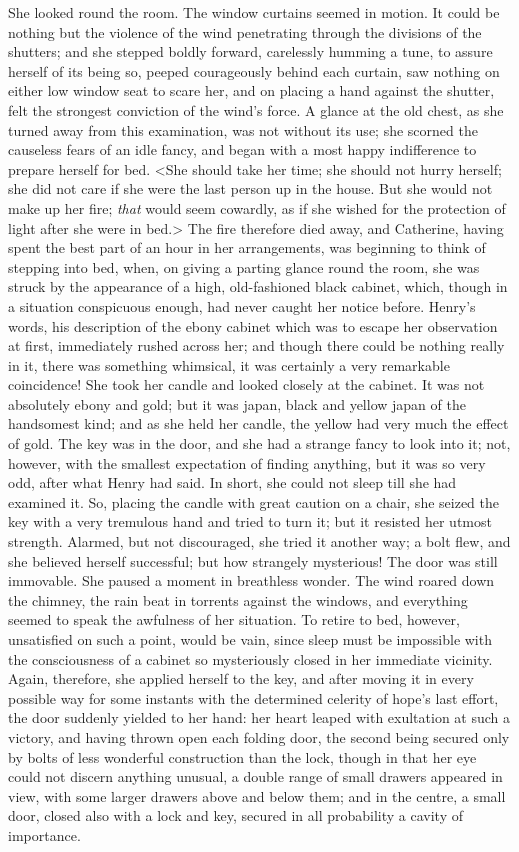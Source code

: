  She looked round the room. The window curtains seemed in motion. It could be nothing but the violence of the wind penetrating through the divisions of the shutters; and she stepped boldly forward, carelessly humming a tune, to assure herself of its being so, peeped courageously behind each curtain, saw nothing on either low window seat to scare her, and on placing a hand against the shutter, felt the strongest conviction of the wind's force. A glance at the old chest, as she turned away from this examination, was not without its use; she scorned the causeless fears of an idle fancy, and began with a most happy indifference to prepare herself for bed. <She should take her time; she should not hurry herself; she did not care if she were the last person up in the house. But she would not make up her fire; \textit{that} would seem cowardly, as if she wished for the protection of light after she were in bed.> The fire therefore died away, and Catherine, having spent the best part of an hour in her arrangements, was beginning to think of stepping into bed, when, on giving a parting glance round the room, she was struck by the appearance of a high, old-fashioned black cabinet, which, though in a situation conspicuous enough, had never caught her notice before. Henry's words, his description of the ebony cabinet which was to escape her observation at first, immediately rushed across her; and though there could be nothing really in it, there was something whimsical, it was certainly a very remarkable coincidence! She took her candle and looked closely at the cabinet. It was not absolutely ebony and gold; but it was japan, black and yellow japan of the handsomest kind; and as she held her candle, the yellow had very much the effect of gold. The key was in the door, and she had a strange fancy to look into it; not, however, with the smallest expectation of finding anything, but it was so very odd, after what Henry had said. In short, she could not sleep till she had examined it. So, placing the candle with great caution on a chair, she seized the key with a very tremulous hand and tried to turn it; but it resisted her utmost strength. Alarmed, but not discouraged, she tried it another way; a bolt flew, and she believed herself successful; but how strangely mysterious! The door was still immovable. She paused a moment in breathless wonder. The wind roared down the chimney, the rain beat in torrents against the windows, and everything seemed to speak the awfulness of her situation. To retire to bed, however, unsatisfied on such a point, would be vain, since sleep must be impossible with the consciousness of a cabinet so mysteriously closed in her immediate vicinity. Again, therefore, she applied herself to the key, and after moving it in every possible way for some instants with the determined celerity of hope's last effort, the door suddenly yielded to her hand: her heart leaped with exultation at such a victory, and having thrown open each folding door, the second being secured only by bolts of less wonderful construction than the lock, though in that her eye could not discern anything unusual, a double range of small drawers appeared in view, with some larger drawers above and below them; and in the centre, a small door, closed also with a lock and key, secured in all probability a cavity of importance. 

